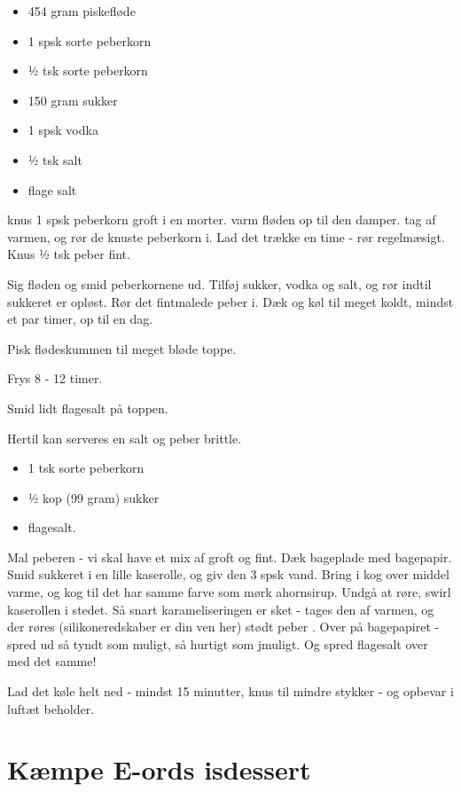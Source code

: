 \documentclass[
  letterpaper,
  DIV=11,
  numbers=noendperiod]{scrreprt}
\providecommand{\tightlist}{%
  \setlength{\itemsep}{0pt}\setlength{\parskip}{0pt}}\usepackage{longtable,booktabs,array}
\begin{document}
\begin{itemize}
\tightlist
\item
  454 gram piskefløde
\item
  1 spsk sorte peberkorn
\item
  ½ tsk sorte peberkorn
\item
  150 gram sukker
\item
  1 spsk vodka
\item
  ½ tsk salt
\item
  flage salt
\end{itemize}

knus 1 spsk peberkorn groft i en morter. varm fløden op til den damper.
tag af varmen, og rør de knuste peberkorn i. Lad det trække en time -
rør regelmæsigt. Knus ½ tsk peber fint.

Sig fløden og smid peberkornene ud. Tilføj sukker, vodka og salt, og rør
indtil sukkeret er opløst. Rør det fintmalede peber i. Dæk og køl til
meget koldt, mindst et par timer, op til en dag.

Pisk flødeskummen til meget bløde toppe.

Frys 8 - 12 timer.

Smid lidt flagesalt på toppen.

Hertil kan serveres en salt og peber brittle.

\begin{itemize}
\tightlist
\item
  1 tsk sorte peberkorn
\item
  ½ kop (99 gram) sukker
\item
  flagesalt.
\end{itemize}

Mal peberen - vi skal have et mix af groft og fint. Dæk bageplade med
bagepapir. Smid sukkeret i en lille kaserolle, og giv den 3 spsk vand.
Bring i kog over middel varme, og kog til det har samme farve som mørk
ahornsirup. Undgå at røre, swirl kaserollen i stedet. Så snart
karameliseringen er sket - tages den af varmen, og der røres
(silikoneredskaber er din ven her) stødt peber . Over på bagepapiret -
spred ud så tyndt som muligt, så hurtigt som jmuligt. Og spred flagesalt
over med det samme!

Lad det køle helt ned - mindst 15 minutter, knus til mindre stykker - og
opbevar i luftæt beholder.

\hypertarget{kuxe6mpe-e-ords-isdessert}{%
\section{Kæmpe E-ords isdessert}\label{kuxe6mpe-e-ords-isdessert}}
\end{document}
